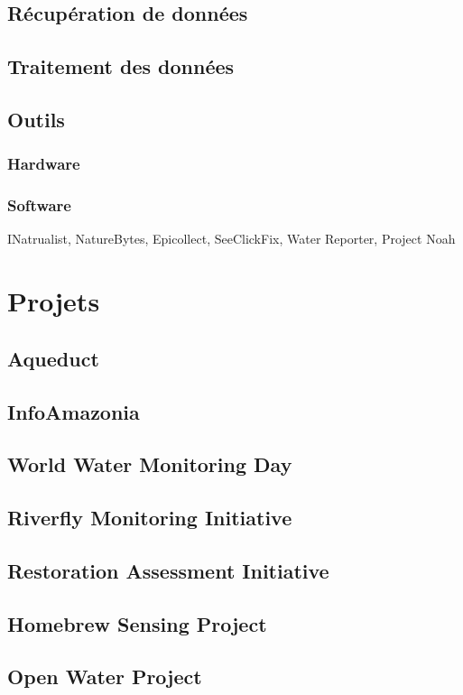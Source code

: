 \documentclass[10pt, conference, compsocconf]{llncs}
\begin{document}
	\subsection{Récupération de données}
	\subsection{Traitement des données}
	\subsection{Outils}
		\subsubsection{Hardware}
		\subsubsection{Software}
		INatrualist, NatureBytes, Epicollect, SeeClickFix, Water Reporter, Project Noah		

\section{Projets}
	\subsection{Aqueduct}
	\subsection{InfoAmazonia}
	\subsection{World Water Monitoring Day}
	\subsection{Riverfly Monitoring Initiative}
	\subsection{Restoration Assessment Initiative}
	\subsection{Homebrew Sensing Project}
	\subsection{Open Water Project}
\end{document}

